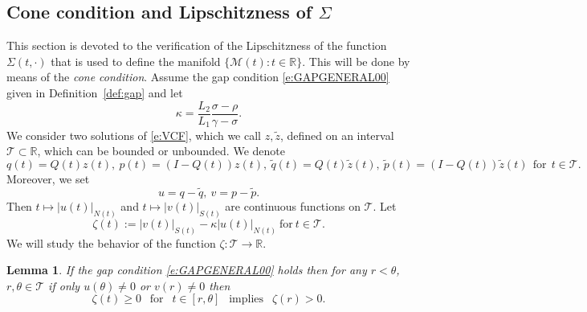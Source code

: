 \documentclass[a4paper,11pt,reqno]{amsart}
\theoremstyle{plain}
\newtheorem{lem}{Lemma}[section]
\theoremstyle{definition}
\numberwithin{equation}{section}
\newcommand{\R}{\mathbb{R}}
\newcommand{\calm}{\mathcal M}
\newcommand{\calt}{\mathcal T}
\renewcommand{\geq}{\geqslant}
\begin{document}
\color{black}


\subsection{Cone condition and Lipschitzness of \texorpdfstring{$\Sigma$}.}%
This section is devoted to the verification of the Lipschitzness of the function $\Sigma(t,\cdot)$ that is used to define the manifold $\{\calm(t)\colon t\in\R\}$. This will be done by means of the \textit{cone condition}. \color{black}  Assume the gap condition \eqref{e:GAPGENERAL00} given in Definition~\ref{def:gap} and let 
\begin{equation}\label{e:DEFNKAPPA}
\kappa = \frac{L_2}{L_1}\frac{\sigma-\rho}{\gamma-\sigma}. 
\end{equation}
We consider two solutions of \eqref{e:VCF}, which we call $z, \tilde z$, defined on an interval $\calt\subset\R$, which can be bounded or unbounded. We denote $$q(t)=Q(t)z(t),\ p(t)=(I-Q(t))z(t),\ \tilde q(t)=Q(t)\tilde z(t),\ \tilde p(t)=(I-Q(t))\tilde z(t)\ \ \text{for}\ \ t\in\calt.$$
Moreover, we set
$$u=q-\tilde q,\ v=p-\tilde{p}.$$
Then $t\mapsto |u(t)|_{N(t)}$ and $t\mapsto |v(t)|_{S(t)}$ are continuous functions on $\calt$. 
Let 
\begin{equation}\label{e:DEFNZETA}
\zeta(t):=|v(t)|_{S(t)}-\kappa |u(t)|_{N(t)}\ \text{for}\ t\in\calt.
\end{equation}
We will study the behavior of the function $\zeta\colon \calt\to \R$. 

\begin{lem}\label{lem:POS}
If the gap condition \eqref{e:GAPGENERAL00} holds then for any $r<\theta$, $r,\theta\in\calt$ if only $u(\theta)\neq 0$  or $v(r)\neq 0$ then 
$$\zeta(t) \geq 0\ \ \text{ for }\ \ t\in [r,\theta]\ \ \text{ implies }\ \ \zeta(r)>0.$$ 
\end{lem}
\end{document}
